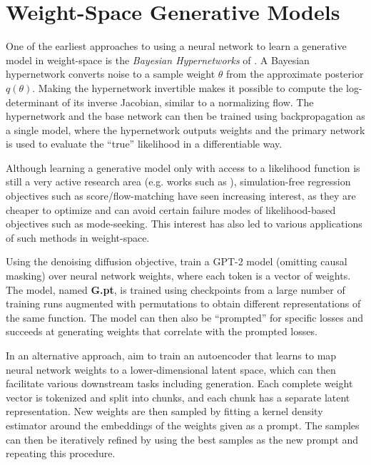 \section{Weight-Space Generative Models}

One of the earliest approaches to using a neural network to learn a generative model in weight-space is the \textit{Bayesian Hypernetworks} of \citet{kruegerBayesianHypernetworks2018}. A Bayesian hypernetwork converts noise to a sample weight $\theta$ from the approximate posterior $q(\theta)$. Making the hypernetwork invertible makes it possible to compute the log-determinant of its inverse Jacobian, similar to a normalizing flow. The hypernetwork and the base network can then be trained using backpropagation as a single model, where the hypernetwork outputs weights and the primary network is used to evaluate the ``true'' likelihood in a differentiable way. 

Although learning a generative model only with access to a likelihood function is still a very active research area (e.g. works such as \citep{tongImprovingGeneralizingFlowbased2023}), simulation-free regression objectives such as score/flow-matching have seen increasing interest, as they are cheaper to optimize and can avoid certain failure modes of likelihood-based objectives such as mode-seeking. This interest has also led to various applications of such methods in weight-space.

Using the denoising diffusion objective, \citet{peeblesLearningLearnGenerative2022} train a GPT-2 model \citep{radfordLanguageModelsAre2019} (omitting causal masking) over neural network weights, where each token is a vector of weights. The model, named \textbf{G.pt}, is trained using checkpoints from a large number of training runs augmented with permutations to obtain different representations of the same function. The model can then also be ``prompted'' for specific losses and succeeds at generating weights that correlate with the prompted losses. 

In an alternative approach, \citet{schurholtScalableVersatileWeight2024} aim to train an autoencoder that learns to map neural network weights to a lower-dimensional latent space, which can then facilitate various downstream tasks including generation. Each complete weight vector is tokenized and split into chunks, and each chunk has a separate latent representation. New weights are then sampled by fitting a kernel density estimator around the embeddings of the weights given as a prompt. The samples can then be iteratively refined by using the best samples as the new prompt and repeating this procedure. 


